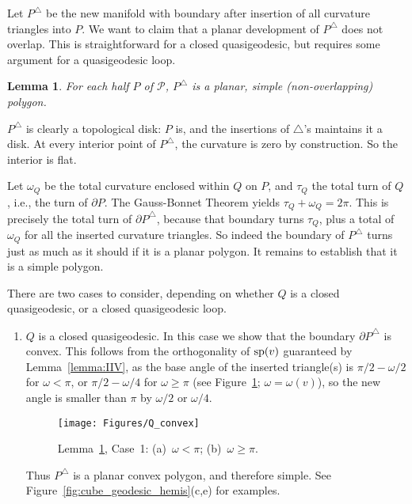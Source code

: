 \pdfoutput=1  \documentclass[]{article}
\newcommand{\hide}[1]{}
\newcommand{\ABox}{
\raisebox{3pt}{\framebox[6pt]{\rule{6pt}{0pt}}}
}
\newenvironment{proof}{{\bf Proof:}}{\hfill\ABox}
\newtheorem{lemma}[theorem]{Lemma}
\newcommand{\lemlab}[1]{\label{lemma:#1}}
\newcommand{\figlab}[1]{\label{fig:#1}}
\newcommand{\lemref}[1]{\ref{lemma:#1}}
\newcommand{\figref}[1]{\ref{fig:#1}}
\def\P{{\mathcal P}}
\def\o{{\omega}}
\def\sp{\mathop{\rm sp}\nolimits}
\def\bP{{\partial P}}
\begin{document}
Let $P^\triangle$ be
the new manifold with boundary after insertion of all 
curvature triangles into $P$.
We want to claim that a planar development of $P^\triangle$ does not
overlap.  This is straightforward for a closed quasigeodesic,
but requires some argument for a quasigeodesic loop.
\begin{lemma}
For each half $P$ of $\P$,
$P^\triangle$ is a planar, simple (non-overlapping) polygon.
\lemlab{convex.polygon}
\end{lemma}
\begin{proof}
$P^\triangle$ is clearly a topological disk: $P$ is, and the insertions of $\triangle$'s
maintains it a disk.
At every interior point of $P^\triangle$, the curvature is zero by construction.
So the interior is flat.

Let $\o_Q$ be the total curvature enclosed within $Q$ on $P$,
and $\tau_Q$ the total turn of $Q$, i.e., the turn of $\bP$.
The Gauss-Bonnet Theorem yields $\tau_Q + \o_Q = 2\pi$.
This is precisely the total turn of $\bP^\triangle$, because
that boundary turns $\tau_Q$, plus a total of $\o_Q$ for all the
inserted curvature triangles.
So indeed the boundary of $P^\triangle$ turns just as much as it should
if it is a planar polygon.  It remains to establish
that it is a simple polygon.

There are two cases to consider,
depending on whether $Q$ is a closed quasigeodesic, or a closed
quasigeodesic loop.
\begin{enumerate}
\item $Q$ is a closed quasigeodesic.
In this case we show that the boundary 
$\bP^\triangle$
is convex.
This follows from the orthogonality of $\sp(v)$ guaranteed by Lemma~\lemref{IIV},
as the base angle of the inserted triangle(s) is
$\pi/2 - \o/2$ for $\o < \pi$,
or $\pi/2 - \o/4$ for $\o \ge \pi$
(see Figure~\figref{Q_convex}; $\o=\o(v)$),
so the new angle is smaller than $\pi$ by $\o/2$ or $\o/4$.
\begin{figure}[htbp]
\centering
\texttt{[image: Figures/Q\_convex]}
\caption{Lemma~\protect\lemref{convex.polygon}, Case~1: 
(a)~$\o < \pi$; (b)~$\o \ge \pi$.}
\figlab{Q_convex}
\end{figure}
Thus $P^\triangle$ is a planar convex polygon, and therefore simple.
See Figure~\figref{cube_geodesic_hemis}(c,e) for examples.

\hide{
Note that, when the total curvature in $P$ is $2\pi$
then the straight development
of $Q$ is turned $2\pi$ by the $\triangle$ insertions,
as in~(b) of the figure.
When the total curvature in $P$ is ${<}2\pi$,
the development of $Q$ is not straight, but the $\triangle$ insertions
turn it exactly the additional amount needed to close it to $2\pi$,
as in~(d) of the figure.
}



\end{enumerate}
\end{proof}
\end{document}
